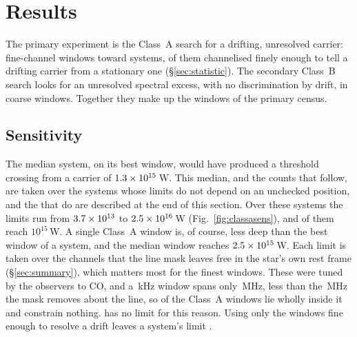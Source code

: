 \section{Results}
\label{sec:results}

The primary experiment is the Class~A search for a drifting, unresolved
carrier: \NWinA{} fine-channel windows toward \NSysClassA{} systems,
\EdrNWinA{} of them channelised finely enough to tell a drifting carrier from
a stationary one (\S\ref{sec:statistic}). The secondary Class~B search looks
for an unresolved spectral excess, with no discrimination by drift, in
\NWinB{} coarse windows. Together they make up the \NWindows{} windows of the
primary census.

\subsection{Sensitivity}
\label{sec:pninetysel}

The median system, on its best window, would have produced a threshold
crossing from a carrier of $1.3\times10^{15}$\,W. This median, and the
counts that follow, are taken over the \NSysALimSum{} systems whose limits do
not depend on an unchecked position, and the \OmNFlagWord{} that do are
described at the end of this section. Over these systems the limits run from $3.7\times10^{13}$ to
$2.5\times10^{16}$\,W (Fig.~\ref{fig:classasens}), and \NSysEfifteen{} of
them reach $10^{15}$\,W. A single Class~A window is, of course, less deep than
the best window of a system, and the median window reaches
$2.5\times10^{15}$\,W. Each limit is taken over the channels that the line
mask leaves free in the star's own rest frame (\S\ref{sec:summary}), which
matters most for the finest windows. These were tuned by the observers to CO,
and a \UmFineChanKHz\,kHz window spans only \UmFineBwMHz\,MHz, less than the
\UmFineMaskMHz\,MHz the mask removes about the line, so \UmNWinAFull{} of the
Class~A windows lie wholly inside it and constrain nothing. \NSysALostName{}
has no limit for this reason. Using only the \EdrNWinA{} windows fine enough
to resolve a drift leaves a system's limit \ScEdrMedClause.

